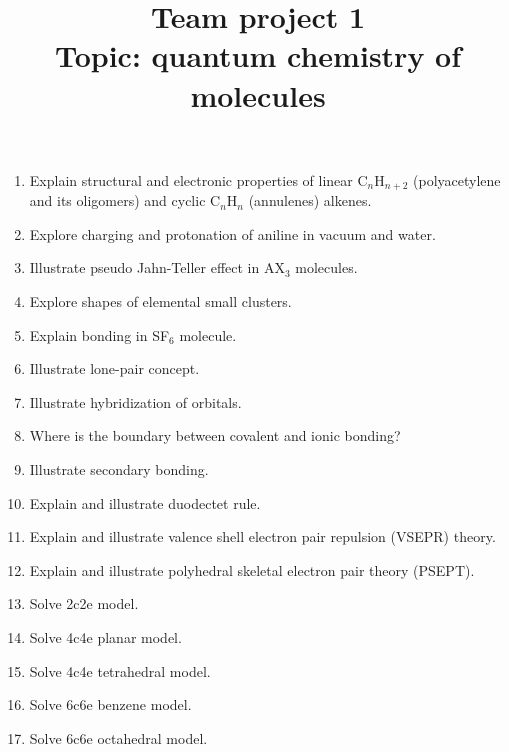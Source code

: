 \documentclass{Project}
\begin{document}
\title{Team project 1 \\ Topic: quantum chemistry of molecules}
\maketitle

\preface{}

\begin{enumerate}
\item Explain structural and electronic properties of linear C$_n$H$_{n+2}$ (polyacetylene and its oligomers) and cyclic C$_n$H$_n$ (annulenes) alkenes.
\item Explore charging and protonation of aniline in vacuum and water.
\item Illustrate pseudo Jahn-Teller effect in AX$_3$ molecules.
\item Explore shapes of elemental small clusters.
\item Explain bonding in SF$_6$ molecule.
\item Illustrate lone-pair concept.
\item Illustrate hybridization of orbitals.
\item Where is the boundary between covalent and ionic bonding?
\item Illustrate secondary bonding.
\item Explain and illustrate duodectet rule.
\item Explain and illustrate valence shell electron pair repulsion (VSEPR) theory.
\item Explain and illustrate polyhedral skeletal electron pair theory (PSEPT).
\item Solve 2c2e model.
\item Solve 4c4e planar model.
\item Solve 4c4e tetrahedral model.
\item Solve 6c6e benzene model.
\item Solve 6c6e octahedral model.
\end{enumerate}

\reminder{}
\end{document}
